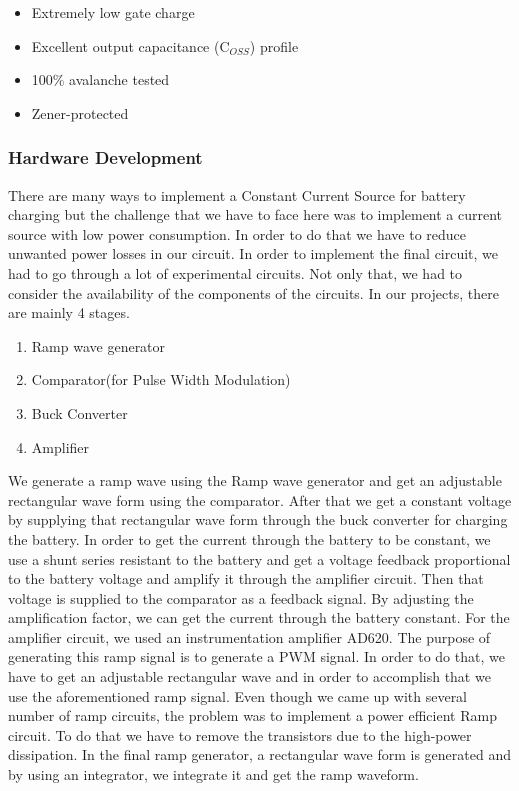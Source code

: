 \documentclass[a4paper,12pt]{article}
\newcounter{subsubsubsection}[subsubsection]
\begin{document}
\begin{multicols}{2}
\begin{itemize}
    \item Extremely low gate charge
    \item Excellent output capacitance (C$_{OSS}$) profile
    \item 100\% avalanche tested
    \item Zener-protected
\end{itemize}
\subsubsection{Hardware Development}
There are many ways to implement a Constant Current Source for battery charging but the challenge that we have to face here was to implement a current source with low power consumption. In order to do that we have to reduce unwanted power losses in our circuit. In order to implement the final circuit, we had to go through a lot of experimental circuits. Not only that, we had to consider the availability of the components of the circuits. In our projects, there are mainly 4 stages.
\begin{enumerate}
    \item Ramp wave generator
    \item Comparator(for Pulse Width Modulation)
    \item Buck Converter
    \item Amplifier
\end{enumerate}
We generate a ramp wave using the Ramp wave generator and get an adjustable rectangular wave form using the comparator.  After that we get a constant voltage by supplying that rectangular wave form through the buck converter for charging the battery. In order to get the current through the battery to be constant, we use a shunt series resistant to the battery and get a voltage feedback proportional to the battery voltage and amplify it through the amplifier circuit. Then that voltage is supplied to the comparator as a feedback signal. By adjusting the amplification factor, we can get the current through the battery constant. For the amplifier circuit, we used an instrumentation amplifier AD620.
The purpose of generating this ramp signal is to generate a PWM signal. In order to do that, we have to get an adjustable rectangular wave and in order to accomplish that we use the aforementioned ramp signal. Even though we came up with several number of ramp circuits, the problem was to implement a power efficient Ramp circuit. To do that we have to remove the transistors due to the high-power dissipation. In the final ramp generator, a rectangular wave form is generated and by using an integrator, we integrate it and get the ramp waveform.

\end{multicols}
\end{document}
